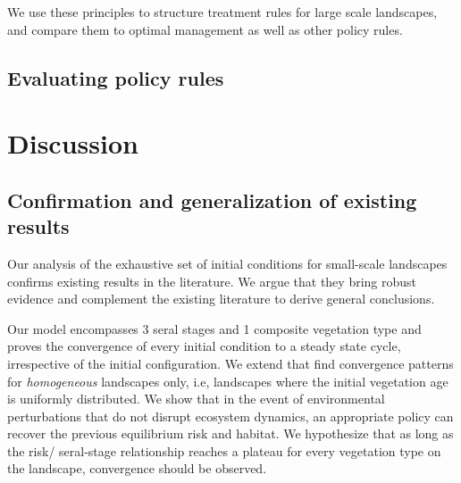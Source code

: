 We use these principles to structure treatment rules for large scale landscapes, and compare them to optimal management as well as other policy rules. 


\FloatBarrier

\subsection{Evaluating policy rules }

\section{Discussion}
\label{section:discussion}

\subsection{Confirmation and generalization of existing results}
Our analysis of the exhaustive set of initial conditions for small-scale landscapes confirms existing results in the literature. We argue that they bring robust evidence and complement the existing literature to derive general conclusions. 

Our model encompasses 3 seral stages and 1 composite vegetation type and proves the convergence of every initial condition to a steady state cycle, irrespective of the initial configuration. We extend \cite{minas_spatial_2014} that find convergence patterns for \textit{homogeneous} landscapes only, i.e, landscapes where the initial vegetation age is uniformly distributed.  We show that in the event of environmental perturbations that do not disrupt ecosystem dynamics, an appropriate policy can recover the previous equilibrium risk and habitat.
We hypothesize that as long as the risk/ seral-stage relationship reaches a plateau for every vegetation type on the landscape, convergence should be observed.


